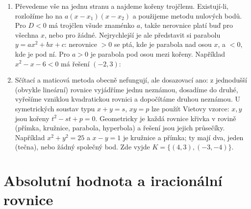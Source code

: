 \begin{enumerate}[label=\textbf{\arabic*.}, leftmargin=*, itemsep=0.8em]
  \item {}
  Převedeme vše na jednu stranu a najdeme kořeny trojčlenu. Existují-li, rozložíme ho na $a(x - x_1)(x - x_2)$ a použijeme metodu nulových bodů. Pro $D < 0$ má trojčlen všude znaménko $a$, takže nerovnice platí buď pro všechna $x$, nebo pro žádné. Nejrychlejší je ale představit si parabolu $y = ax^2 + bx + c$: nerovnice $> 0$ se ptá, kde je parabola nad osou $x$, a $< 0$, kde je pod ní. Pro $a > 0$ je parabola pod osou mezi kořeny. Například $x^2 - x - 6 < 0$ má řešení $(-2, 3)$:
  \begin{center}
  \end{center}

  \item {}
  Sčítací a maticová metoda obecně nefungují, ale dosazovací ano: z jednodušší (obvykle lineární) rovnice vyjádříme jednu neznámou, dosadíme do druhé, vyřešíme vzniklou kvadratickou rovnici a dopočítáme druhou neznámou. U symetrických soustav typu $x + y = s$, $xy = p$ lze použít Vietovy vzorce: $x, y$ jsou kořeny $t^2 - st + p = 0$. Geometricky je každá rovnice křivka v rovině (přímka, kružnice, parabola, hyperbola) a řešení jsou jejich průsečíky. Například $x^2 + y^2 = 25$ a $x - y = 1$ je kružnice a přímka; ty mají dva, jeden (tečna), nebo žádný společný bod. Zde vyjde $K = \{(4, 3), (-3, -4)\}$. 
\end{enumerate}

\section{Absolutní hodnota a iracionální rovnice}

